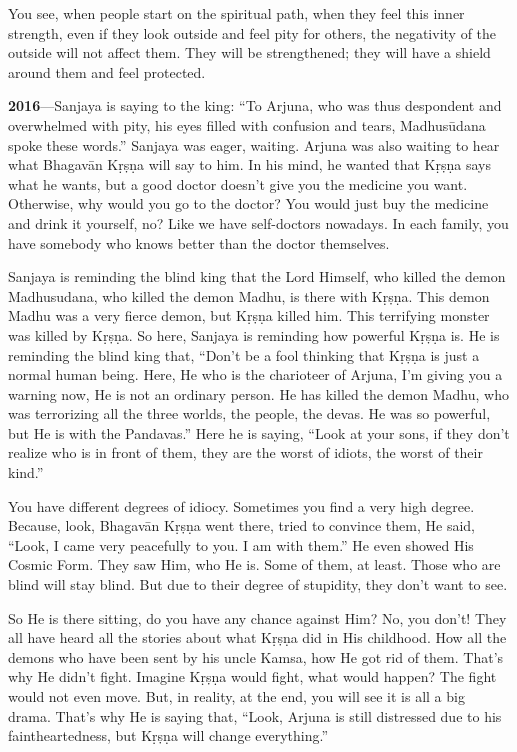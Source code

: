 You see, when people start on the spiritual path, when they feel this inner strength, even if they look outside and feel pity for others, the negativity of the outside will not affect them. They will be strengthened; they will have a shield around them and feel protected.


\textbf{2016}---Sanjaya is saying to the king: “To Arjuna, who was thus despondent and overwhelmed with pity, his eyes filled with confusion and tears, Madhusūdana spoke these words.” Sanjaya was eager, waiting. Arjuna was also waiting to hear what Bhagavān Kṛṣṇa will say to him. In his mind, he wanted that Kṛṣṇa says what he wants, but a good doctor doesn’t give you the medicine you want. Otherwise, why would you go to the doctor? You would just buy the medicine and drink it yourself, no? Like we have self-doctors nowadays. In each family, you have somebody who knows better than the doctor themselves.

Sanjaya is reminding the blind king that the Lord Himself, who killed the demon Madhusudana, who killed the demon Madhu, is there with Kṛṣṇa. This demon Madhu was a very fierce demon, but Kṛṣṇa killed him. This terrifying monster was killed by Kṛṣṇa. So here, Sanjaya is reminding how powerful Kṛṣṇa is. He is reminding the blind king that, “Don’t be a fool thinking that Kṛṣṇa is just a normal human being. Here, He who is the charioteer of Arjuna, I’m giving you a warning now, He is not an ordinary person. He has killed the demon Madhu, who was terrorizing all the three worlds, the people, the devas. He was so powerful, but He is with the Pandavas.” Here he is saying, “Look at your sons, if they don’t realize who is in front of them, they are the worst of idiots, the worst of their kind.”

You have different degrees of idiocy. Sometimes you find a very high degree. Because, look, Bhagavān Kṛṣṇa went there, tried to convince them, He said, “Look, I came very peacefully to you. I am with them.” He even showed His Cosmic Form. They saw Him, who He is. Some of them, at least. Those who are blind will stay blind. But due to their degree of stupidity, they don’t want to see.

So He is there sitting, do you have any chance against Him? No, you don’t! They all have heard all the stories about what Kṛṣṇa did in His childhood. How all the demons who have been sent by his uncle Kamsa, how He got rid of them. That’s why He didn’t fight. Imagine Kṛṣṇa would fight, what would happen? The fight would not even move. But, in reality, at the end, you will see it is all a big drama. That’s why He is saying that, “Look, Arjuna is still distressed due to his faintheartedness, but Kṛṣṇa will change everything.”

